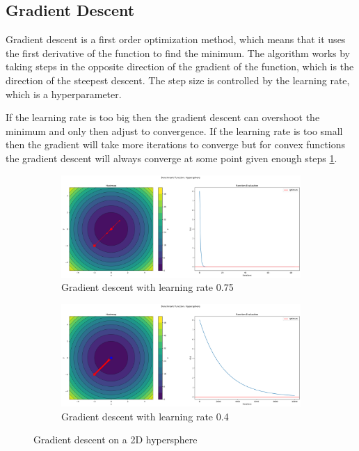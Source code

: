 \subsection{Gradient Descent}
\label{sec:gradient-descent}
Gradient descent is a first order optimization method, which means that it uses the first derivative of the function to find the minimum. The algorithm works by taking steps in the opposite direction of the gradient of the function, which is the direction of the steepest descent. The step size is controlled by the learning rate, which is a hyperparameter.

If the learning rate is too big then the gradient descent can overshoot the minimum and only then adjust to convergence. If the learning rate is too small then the gradient will take more iterations to converge but for convex functions the gradient descent will always converge at some point given enough steps \ref{fig:gd-hypersphere}.

\begin{figure}[H]
    \begin{subfigure}{0.5\linewidth}
        \includegraphics[width=\linewidth]{lab3/imgs/gd_sphere_75.png}
        \caption{Gradient descent with learning rate 0.75}
    \end{subfigure}
    \begin{subfigure}{0.5\linewidth}
        \includegraphics[width=\linewidth]{lab3/imgs/gd_sphere_04.png}
        \caption{Gradient descent with learning rate 0.4}
    \end{subfigure}
    \caption{Gradient descent on a 2D hypersphere}
    \label{fig:gd-hypersphere}
\end{figure}

